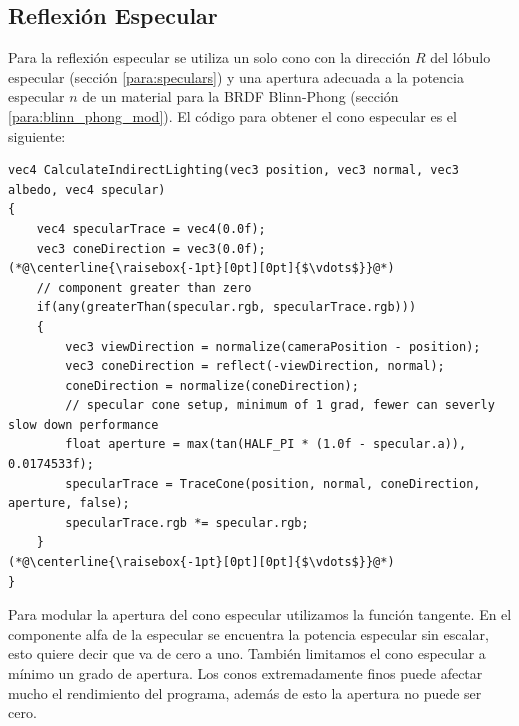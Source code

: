\subsection{Reflexión Especular} %
\label{sub:reflexion_especular}
Para la reflexión especular se utiliza un solo cono con la dirección $R$ del lóbulo especular (sección \ref{para:speculars}) y una apertura adecuada a la potencia especular $n$ de un material para la \ac{BRDF} Blinn-Phong (sección \ref{para:blinn_phong_mod}). El código para obtener el cono especular es el siguiente:
\\
\begin{lstlisting}[caption={Cono para reflexión especular.}, label=Trace4]
vec4 CalculateIndirectLighting(vec3 position, vec3 normal, vec3 albedo, vec4 specular)
{
    vec4 specularTrace = vec4(0.0f);
    vec3 coneDirection = vec3(0.0f);
(*@\centerline{\raisebox{-1pt}[0pt][0pt]{$\vdots$}}@*)
    // component greater than zero
    if(any(greaterThan(specular.rgb, specularTrace.rgb)))
    {
        vec3 viewDirection = normalize(cameraPosition - position);
        vec3 coneDirection = reflect(-viewDirection, normal);
        coneDirection = normalize(coneDirection);
        // specular cone setup, minimum of 1 grad, fewer can severly slow down performance
        float aperture = max(tan(HALF_PI * (1.0f - specular.a)), 0.0174533f);
        specularTrace = TraceCone(position, normal, coneDirection, aperture, false);
        specularTrace.rgb *= specular.rgb;
    }
(*@\centerline{\raisebox{-1pt}[0pt][0pt]{$\vdots$}}@*)
}
\end{lstlisting}
Para modular la apertura del cono especular utilizamos la función tangente. En el componente alfa de la especular se encuentra la potencia especular sin escalar, esto quiere decir que va de cero a uno. También limitamos el cono especular a mínimo un grado de apertura. Los conos extremadamente finos puede afectar mucho el rendimiento del programa, además de esto la apertura no puede ser cero.
